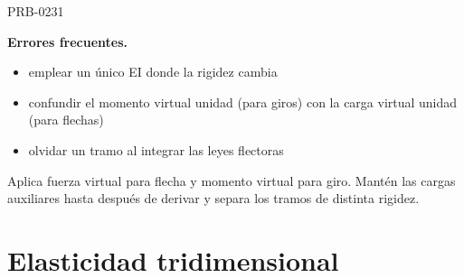 \begin{studiumworked}{PRB-0231}
\begin{minipage}{\linewidth}
\textbf{Errores frecuentes.}\begin{itemize}\item emplear un único EI donde la rigidez cambia
\item confundir el momento virtual unidad (para giros) con la carga virtual unidad (para flechas)
\item olvidar un tramo al integrar las leyes flectoras\end{itemize}

\begin{tcolorbox}[studiumcheck,breakable=false,title={Síntesis y comprobación}]Aplica fuerza virtual para flecha y momento virtual para giro. Mantén las cargas auxiliares hasta después de derivar y separa los tramos de distinta rigidez.\end{tcolorbox}

\end{minipage}

\end{studiumworked}

\chapter{Elasticidad tridimensional}


\Needspace{.3\textheight}

